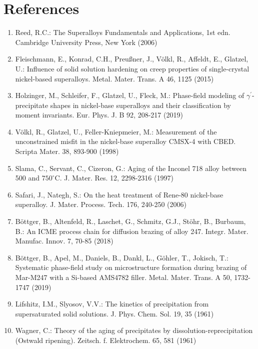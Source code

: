 \documentclass[10pt]{article}
\begin{document}
\section*{References}
\begin{enumerate}
  \item Reed, R.C.: The Superalloys Fundamentals and Applications, 1st edn. Cambridge University Press, New York (2006)

  \item Fleischmann, E., Konrad, C.H., Preußner, J., Völkl, R., Affeldt, E., Glatzel, U.: Influence of solid solution hardening on creep properties of single-crystal nickel-based superalloys. Metal. Mater. Trans. A 46, 1125 (2015)

  \item Holzinger, M., Schleifer, F., Glatzel, U., Fleck, M.: Phase-field modeling of $\gamma^{\prime}$-precipitate shapes in nickel-base superalloys and their classification by moment invariants. Eur. Phys. J. B 92, 208-217 (2019)

  \item Völkl, R., Glatzel, U., Feller-Kniepmeier, M.: Measurement of the unconstrained misfit in the nickel-base superalloy CMSX-4 with CBED. Scripta Mater. 38, 893-900 (1998)

  \item Slama, C., Servant, C., Cizeron, G.: Aging of the Inconel 718 alloy between 500 and $750^{\circ} \mathrm{C}$. J. Mater. Res. 12, 2298-2316 (1997)

  \item Safari, J., Nategh, S.: On the heat treatment of Rene-80 nickel-base superalloy. J. Mater. Process. Tech. 176, 240-250 (2006)

  \item Böttger, B., Altenfeld, R., Laschet, G., Schmitz, G.J., Stöhr, B., Burbaum, B.: An ICME process chain for diffusion brazing of alloy 247. Integr. Mater. Manufac. Innov. 7, 70-85 (2018)

  \item Böttger, B., Apel, M., Daniels, B., Dankl, L., Göhler, T., Jokisch, T.: Systematic phase-field study on microstructure formation during brazing of Mar-M247 with a Si-based AMS4782 filler. Metal. Mater. Trans. A 50, 1732-1747 (2019)

  \item Lifshitz, I.M., Slyosov, V.V.: The kinetics of precipitation from supersaturated solid solutions. J. Phys. Chem. Sol. 19, 35 (1961)

  \item Wagner, C.: Theory of the aging of precipitates by dissolution-reprecipitation (Ostwald ripening). Zeitsch. f. Elektrochem. 65, 581 (1961)


\end{enumerate}
\end{document}
